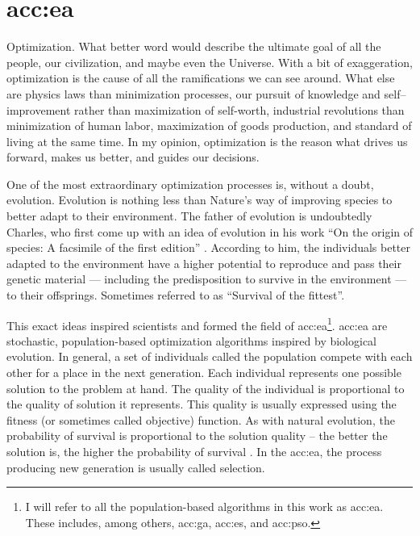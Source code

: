 \chapter{\texorpdfstring{\acrlong*{acc:ea}}{Evolutionary algorithms}}
\label{chap:eva}

Optimization. What better word would describe the ultimate goal of all the people, our civilization, and maybe even the Universe. With a bit of exaggeration, optimization is the cause of all the ramifications we can see around. What else are physics laws than minimization processes, our pursuit of knowledge and self--improvement rather than maximization of self-worth, industrial revolutions than minimization of human labor, maximization of goods production, and standard of living at the same time. In my opinion, optimization is the reason what drives us forward, makes us better, and guides our decisions.

One of the most extraordinary optimization processes is, without a doubt, evolution. Evolution is nothing less than Nature's way of improving species to better adapt to their environment. The father of evolution is undoubtedly Charles, who first come up with an idea of evolution in his work \enquote{On the origin of species: A facsimile of the first edition} \citep{darwin1964origin}. According to him, the individuals better adapted to the environment have a higher potential to reproduce and pass their genetic material --- including the predisposition to survive in the environment --- to their offsprings. Sometimes referred to as \enquote{Survival of the fittest}.

This exact ideas inspired scientists and formed the field of \acrfull{acc:ea}\footnote{I will refer to all the population-based algorithms in this work as \acrlong*{acc:ea}. These includes, among others, \acrlong*{acc:ga}, \acrlong*{acc:es}, and \acrlong*{acc:pso}.}.
\acrshort{acc:ea} are stochastic, population-based optimization algorithms inspired by biological evolution. In general, a set of individuals called the population compete with each other for a place in the next generation. Each individual represents one possible solution to the problem at hand. The quality of the individual is proportional to the quality of solution it represents. This quality is usually expressed using the fitness (or sometimes called objective) function. As with natural evolution, the probability of survival is proportional to the solution quality -- the better the solution is, the higher the probability of survival \citep{IntroductionToEA}. In the \acrshort{acc:ea}, the process producing new generation is usually called selection.

